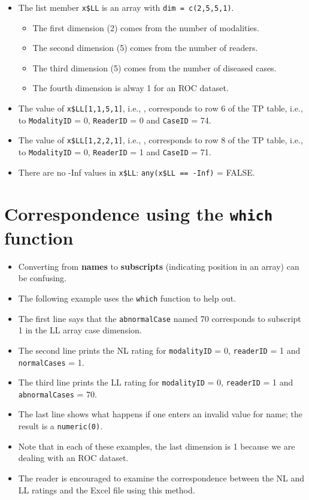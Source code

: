 \documentclass[
]{book}
\providecommand{\tightlist}{%
  \setlength{\itemsep}{0pt}\setlength{\parskip}{0pt}}
\begin{document}
\begin{itemize}
\tightlist
\item
  The list member \texttt{x\$LL} is an array with \texttt{dim\ =\ c(2,5,5,1)}.

  \begin{itemize}
  \tightlist
  \item
    The first dimension (2) comes from the number of modalities.
  \item
    The second dimension (5) comes from the number of readers.
  \item
    The third dimension (5) comes from the number of diseased cases.
  \item
    The fourth dimension is alway 1 for an ROC dataset.
  \end{itemize}
\item
  The value of \texttt{x\$LL{[}1,1,5,1{]}}, i.e., , corresponds to row 6 of the TP table, i.e., to \texttt{ModalityID} = 0, \texttt{ReaderID} = 0 and \texttt{CaseID} = 74.
\item
  The value of \texttt{x\$LL{[}1,2,2,1{]}}, i.e., , corresponds to row 8 of the TP table, i.e., to \texttt{ModalityID} = 0, \texttt{ReaderID} = 1 and \texttt{CaseID} = 71.
\item
  There are no -Inf values in \texttt{x\$LL}: \texttt{any(x\$LL\ ==\ -Inf)} = FALSE.
\end{itemize}

\hypertarget{correspondence-using-the-which-function}{%
\section{\texorpdfstring{Correspondence using the \texttt{which} function}{Correspondence using the which function}}\label{correspondence-using-the-which-function}}

\begin{itemize}
\tightlist
\item
  Converting from \textbf{names} to \textbf{subscripts} (indicating position in an array) can be confusing.
\item
  The following example uses the \texttt{which} function to help out.
\item
  The first line says that the \texttt{abnormalCase} named 70 corresponds to subscript 1 in the LL array case dimension.
\item
  The second line prints the NL rating for \texttt{modalityID} = 0, \texttt{readerID} = 1 and \texttt{normalCases} = 1.
\item
  The third line prints the LL rating for \texttt{modalityID} = 0, \texttt{readerID} = 1 and \texttt{abnormalCases} = 70.
\item
  The last line shows what happens if one enters an invalid value for name; the result is a \texttt{numeric(0)}.
\item
  Note that in each of these examples, the last dimension is 1 because we are dealing with an ROC dataset.
\item
  The reader is encouraged to examine the correspondence between the NL and LL ratings and the Excel file using this method.
\end{itemize}
\end{document}
